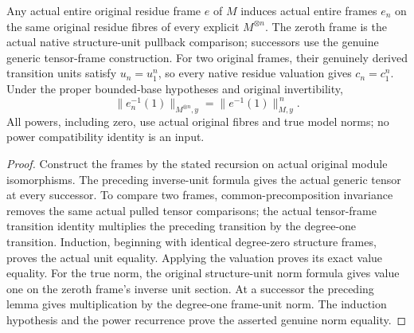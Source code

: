 \begin{theorem}\label{thm:fc-generic-power-frame-true-norm}
\leanok
{}
Any actual entire original residue frame $e$ of $M$ induces actual
entire frames $e_n$ on the same original residue fibres of every
explicit $M^{\otimes n}$. The zeroth frame is the actual native
structure-unit pullback comparison; successors use the genuine
generic tensor-frame construction. For two original frames,
their genuinely derived transition units satisfy $u_n=u_1^n$,
so every native residue valuation gives $c_n=c_1^n$. Under the
proper bounded-base hypotheses and original invertibility,
\[
 \|e_n^{-1}(1)\|_{M^{\otimes n},y}
   =\|e^{-1}(1)\|_{M,y}^{\,n}.
\]
All powers, including zero, use actual original fibres and true
model norms; no power compatibility identity is an input.
\end{theorem}
\begin{proof}
Construct the frames by the stated recursion on actual original
module isomorphisms. The preceding inverse-unit formula gives
the actual generic tensor at every successor. To compare two
frames, common-precomposition invariance removes the same actual
pulled tensor comparisons; the actual tensor-frame transition
identity multiplies the preceding transition by the degree-one
transition. Induction, beginning with identical degree-zero
structure frames, proves the actual unit equality. Applying the
valuation proves its exact value equality. For the true norm,
the original structure-unit norm formula gives value one on the
zeroth frame's inverse unit section. At a successor the preceding
lemma gives multiplication by the degree-one frame-unit norm.
The induction hypothesis and the power recurrence prove the
asserted genuine norm equality.
\end{proof}

